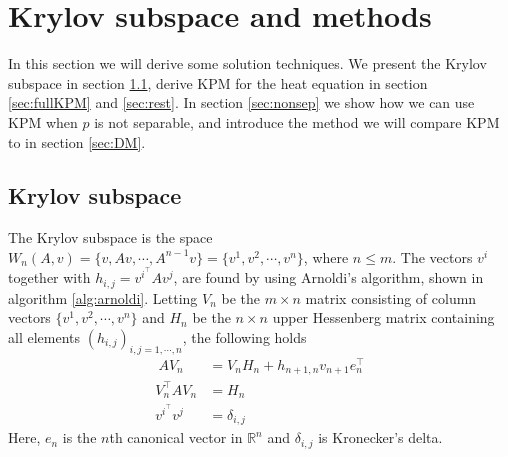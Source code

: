 \chapter{Krylov subspace and methods}%
\label{sec:krylov}
In this section we will derive some solution techniques.
We present the Krylov subspace in section \ref{sec:subspace}, derive KPM for the heat equation in section \ref{sec:fullKPM} and \ref{sec:rest}. In section \ref{sec:nonsep} we show how we can use KPM when $p$ is not separable, and introduce the method we will compare KPM to in section \ref{sec:DM}. 


\section{Krylov subspace} \label{sec:subspace}
The Krylov subspace is the space $W_n (A,v) = \{v,Av, \cdots, A^{n-1}v\} = \{v^1,v^2,\cdots,v^n\} $, where $n \leq m$. %
The vectors $v^i$ together with $h_{i,j} = v^i^\top Av^j$, are found by using Arnoldi's algorithm, shown in algorithm \ref{alg:arnoldi}. Letting $V_n$ be the $m \times n$ matrix consisting of column vectors $\{v^1,v^2,\cdots,v^n \}$ and $H_n$ be the $n \times n$ upper Hessenberg matrix containing all elements $(h_{i,j})_{i,j=1,\cdots,n}$, the following holds \cite{saad}
\begin{align}\
AV_n & = V_n H_n + h_{n+1,n}v_{n+1}e^\top_n \label{eqn:prop1} \\
V^{\top}_n AV_n &= H_n \label{eqn:prop2} \\
v^i^{\top} v^j &= \delta_{i,j} \label{eqn:prop3}
\end{align}
Here, $e_n$ is the $n$th canonical vector in $\mathbb{R}^n$ and $\delta_{i,j}$ is Kronecker's delta.\\




